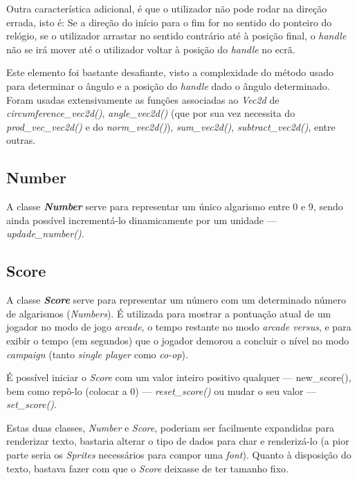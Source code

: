 \documentclass{report}
\begin{document}
Outra característica adicional, é que o utilizador não pode rodar na direção errada, isto é: Se a direção do início para o fim for no sentido do ponteiro do relógio, se o utilizador arrastar no sentido contrário até à posição final, o \textit{handle} não se irá mover até o utilizador voltar à posição do \textit{handle} no ecrã.

Este elemento foi bastante desafiante, visto a complexidade do método usado para determinar o ângulo e a posição do \textit{handle} dado o ângulo determinado. Foram usadas extensivamente as funções associadas ao \textit{Vec2d} de \textit{circumference\_vec2d()}, \textit{angle\_vec2d()} (que por sua vez necessita do \textit{prod\_vec\_vec2d()} e do \textit{norm\_vec2d()}), \textit{sum\_vec2d()}, \textit{subtract\_vec2d()}, entre outras.

\subsection{Number}

A classe \textbf{\textit{Number}} serve para representar um único algarismo entre 0 e 9, sendo ainda possível incrementá-lo dinamicamente por um unidade --- \textit{updade\_number()}.

\subsection{Score}

A classe \textbf{\textit{Score}} serve para representar um número com um determinado número de algarismos (\textit{Numbers}). É utilizada para mostrar a pontuação atual de um jogador no modo de jogo \textit{arcade}, o tempo restante no modo \textit{arcade versus}, e para exibir o tempo (em segundos) que o jogador demorou a concluir o nível no modo \textit{campaign} (tanto \textit{single player} como \textit{co-op}).

É possível iniciar o \textit{Score} com um valor inteiro positivo qualquer --- new\_score(), bem como repô-lo (colocar a 0) --- \textit{reset\_score()} ou mudar o seu valor --- \textit{set\_score()}. \newline

Estas duas classes, \textit{Number} e \textit{Score}, poderiam ser facilmente expandidas para renderizar texto, bastaria alterar o tipo de dados para char e renderizá-lo (a pior parte seria os \textit{Sprites} necessários para compor uma \textit{font}). Quanto à disposição do texto, bastava fazer com que o \textit{Score} deixasse de ter tamanho fixo.
\end{document}
